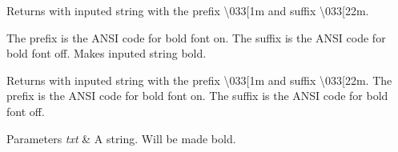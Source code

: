 Returns with inputed string with the prefix \textquotesingle{}\textbackslash{}033\mbox{[}1m\textquotesingle{} and suffix \textquotesingle{}\textbackslash{}033\mbox{[}22m\textquotesingle{}. 

The prefix is the A\+N\+SI code for bold font on. The suffix is the A\+N\+SI code for bold font off. Makes inputed string bold.

Returns with inputed string with the prefix \textquotesingle{}\textbackslash{}033\mbox{[}1m\textquotesingle{} and suffix \textquotesingle{}\textbackslash{}033\mbox{[}22m\textquotesingle{}. The prefix is the A\+N\+SI code for bold font on. The suffix is the A\+N\+SI code for bold font off.


\begin{DoxyParams}{Parameters}
{\em txt} & A string. Will be made bold. \\
\hline
\end{DoxyParams}
